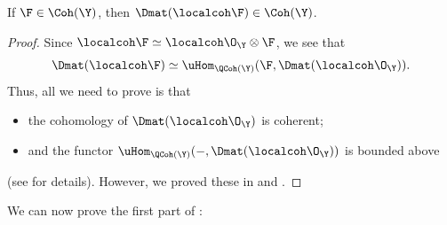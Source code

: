 \documentclass{amsart}
\begin{document}
  \begin{prop}\label{prop:dloc_coh}
    If \(\F \in \Coh(\Y)\), then \(\Dmat(\localcoh \F) \in \Coh(\Y)\).
  \end{prop}
  \begin{proof}
    Since \(\localcoh \F \simeq \localcoh \O_\Y \otimes \F\), we see that
    \begin{displaymath}
      \Dmat(\localcoh \F) \simeq \uHom_{\QCoh(\Y)}(\F, \Dmat(\localcoh \O_\Y)).
    \end{displaymath}
    Thus, all we need to prove is that
    \begin{itemize}
      \item the cohomology of \(\Dmat(\localcoh \O_\Y)\) is coherent;
      \item and the functor \(\uHom_{\QCoh(\Y)}(-, \Dmat(\localcoh \O_\Y))\)
        is bounded above
    \end{itemize}
    (see \cite[Proposition II.7.20]{hartshorne:1966} for details).
    However, we proved these in  and
    .
  \end{proof}


  \sssec{}

  We can now prove the first part of :
\end{document}
